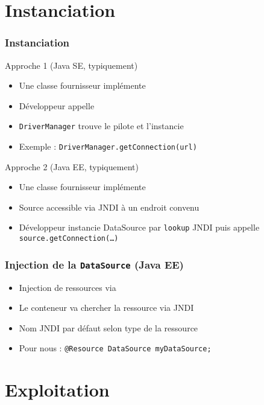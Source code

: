 \documentclass[english, french]{beamer}
\begin{document}
\section{Instanciation}
\begin{frame}
	\frametitle{Instanciation}
	\begin{block}{Approche 1 (Java SE, typiquement)}
		\begin{itemize}
			\item Une classe fournisseur implémente 
			\item Développeur appelle 
			\item \texttt{DriverManager} trouve le pilote et l’instancie
			\item Exemple : \texttt{DriverManager.getConnection(url)}
		\end{itemize}
	\end{block}
	\begin{block}{Approche 2 (Java EE, typiquement)}
		\begin{itemize}
			\item Une classe fournisseur implémente 
			\item Source accessible via JNDI à un endroit convenu
			\item Développeur instancie DataSource par \texttt{lookup} JNDI puis appelle \texttt{source.getConnection(…)}
		\end{itemize}
	\end{block}
\end{frame}

\begin{frame}
	\frametitle{Injection de la \texttt{DataSource} (Java EE)}
	\begin{itemize}
		\item Injection de ressources via 
		\item Le conteneur va chercher la ressource via JNDI
		\item Nom JNDI par défaut selon type de la ressource
		\item Pour nous : \texttt{@Resource DataSource myDataSource;}
	\end{itemize}
\end{frame}

\section{Exploitation}
\end{document}

